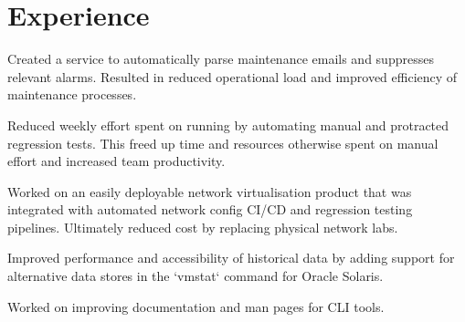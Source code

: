 \documentclass[]{resume}
\begin{document}
\begin{minipage}[t]{0.70\textwidth}

\section{Experience}

\vspace{2pt}
\vspace{10pt}
\begin{tightemize}
\item  Created a service to automatically parse maintenance emails and suppresses
relevant alarms. Resulted in reduced operational load and improved efficiency
of maintenance processes.
\item Reduced weekly effort spent on running by automating manual and protracted regression tests.
This freed up time and resources otherwise spent on manual effort and increased team productivity.
\item Worked on an easily deployable network virtualisation product that was integrated with
automated network config CI/CD and regression testing pipelines. Ultimately reduced cost by
replacing physical network labs.
\end{tightemize}
\subsectionsep

\vspace{2pt}
\vspace{1pt}
\begin{tightemize}
\item Improved performance and accessibility of historical data by adding support for
alternative data stores in the `vmstat` command for Oracle Solaris.
\item Worked on improving documentation and man pages for CLI tools.
\end{tightemize}
\subsectionsep  %


\end{minipage}
\end{document}
